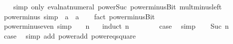\begin{isabellebody}
%
\isadelimproof
\ \ %
\endisadelimproof
%
\isatagproof
{}\isamarkupfalse%
\ {\isacharparenleft}{\kern0pt}simp\ only{\isacharcolon}{\kern0pt}\ eval{\isacharunderscore}{\kern0pt}nat{\isacharunderscore}{\kern0pt}numeral{\isacharparenleft}{\kern0pt}{}{\isacharparenright}{\kern0pt}\ power{\isacharunderscore}{\kern0pt}Suc\ power{\isacharunderscore}{\kern0pt}minus{\isacharunderscore}{\kern0pt}Bit{}\ mult{\isacharunderscore}{\kern0pt}minus{\isacharunderscore}{\kern0pt}left{\isacharparenright}{\kern0pt}%
\endisatagproof
{\isafoldproof}%
%
\isadelimproof
\isanewline
%
\endisadelimproof
\isanewline
{}\isamarkupfalse%
\ power{}{\isacharunderscore}{\kern0pt}minus\ {\isacharbrackleft}{\kern0pt}simp{\isacharbrackright}{\kern0pt}{\isacharcolon}{\kern0pt}\ {\isachardoublequoteopen}{\isacharparenleft}{\kern0pt}{\isacharminus}{\kern0pt}\ a{\isacharparenright}{\kern0pt}\ {\isacharequal}{\kern0pt}\ a\isanewline
%
\isadelimproof
\ \ %
\endisadelimproof
%
\isatagproof
{}\isamarkupfalse%
\ {\isacharparenleft}{\kern0pt}fact\ power{\isacharunderscore}{\kern0pt}minus{\isacharunderscore}{\kern0pt}Bit{}{\isacharparenright}{\kern0pt}%
\endisatagproof
{\isafoldproof}%
%
\isadelimproof
\isanewline
%
\endisadelimproof
\isanewline
{}\isamarkupfalse%
\ power{\isacharunderscore}{\kern0pt}minus{}{\isacharunderscore}{\kern0pt}even\ {\isacharbrackleft}{\kern0pt}simp{\isacharbrackright}{\kern0pt}{\isacharcolon}{\kern0pt}\ {\isachardoublequoteopen}{\isacharparenleft}{\kern0pt}{\isacharminus}{\kern0pt}\ {}{\isacharparenright}{\kern0pt}\ {\isacharcircum}{\kern0pt}\ {\isacharparenleft}{\kern0pt}{}{\isacharasterisk}{\kern0pt}n{\isacharparenright}{\kern0pt}\ {\isacharequal}{\kern0pt}\ {}{\isachardoublequoteclose}\isanewline
%
\isadelimproof
%
\endisadelimproof
%
\isatagproof
{}\isamarkupfalse%
\ {\isacharparenleft}{\kern0pt}induct\ n{\isacharparenright}{\kern0pt}\isanewline
\ \ \isamarkupfalse%
\ {}\isanewline
\ \ \isamarkupfalse%
\ {\isacharquery}{\kern0pt}case\ \isamarkupfalse%
\ simp\isanewline
{}\isamarkupfalse%
\isanewline
\ \ \isamarkupfalse%
\ {\isacharparenleft}{\kern0pt}Suc\ n{\isacharparenright}{\kern0pt}\isanewline
\ \ \isamarkupfalse%
\ \isamarkupfalse%
\ {\isacharquery}{\kern0pt}case\ \isamarkupfalse%
\ {\isacharparenleft}{\kern0pt}simp\ add{\isacharcolon}{\kern0pt}\ power{\isacharunderscore}{\kern0pt}add\ power{}{\isacharunderscore}{\kern0pt}eq{\isacharunderscore}{\kern0pt}square{\isacharparenright}{\kern0pt}\isanewline

\end{isabellebody}
